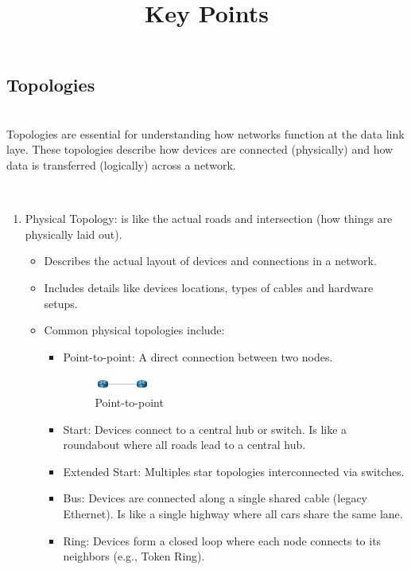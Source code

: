 \documentclass[a4paper,11pt]{article}
\begin{document}
\subsection{Topologies}\\
Topologies are essential for understanding how networks function at the data link laye. These topologies describe how devices are connected (physically) and how data is transferred (logically) across a network.\\

\title{Key Points}\\
\begin{enumerate}
    \item Physical Topology: is like the actual roads and intersection (how things are physically laid out).\\
    \begin{itemize}
        \item Describes the actual layout of devices and connections in a network.\\
        \item Includes details like devices locations,  types of cables and hardware setups.\\
        \item Common physical topologies include:\\
        \begin{itemize}
            \item Point-to-point: A direct connection between two nodes.\\
    \begin{figure}[h!]
    \centering
    \includegraphics[width=0.2\textwidth]{23.png}
    \caption{Point-to-point}
    \label{fig:cap1}
    \end{figure}
            \item Start: Devices connect to a central hub or switch. Is like a roundabout where all roads lead to a central hub.\\
            \item Extended Start:  Multiples star topologies interconnected via switches.\\
            \item Bus: Devices are connected along a single shared cable (legacy Ethernet). Is like a single highway where all cars share the same lane.\\
            \item Ring: Devices form a closed loop where each node connects to its neighbors (e.g., Token Ring).\\
        \end{itemize}
    \end{itemize}


\end{enumerate}
\end{document}
